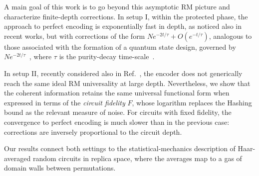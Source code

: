 \documentclass[aps,prl,twocolumn,superscriptaddress,numerical]{revtex4-2}
\begin{document}
A main goal of this work is to go beyond this asymptotic RM picture and characterize finite-depth corrections. In setup I, within the protected phase, the approach to perfect encoding is exponentially fast in depth, as noticed also in recent works, but with corrections of the form $N e^{-2t/\tau}+O(e^{-t/\tau})$, analogous to those associated with the formation of a quantum state design, governed by $N e^{-2t/\tau}$~\cite{lami2025anticoncentration,dowling2025freeindependenceunitarydesign,HarrowLow2009Designs,BrandaoHarrowHorodecki2016CMP,7rzk-2jyh}, where $\tau$ is the purity-decay time-scale~\cite{Nahum2017EntanglementGrowthPRX,Nahum2018OperatorSpreadingPRX}.

In setup II, recently considered also in Ref.~\cite{Nelson2025_ErrorCorrectionPhaseTransition_NoisyRandomCircuits}, the encoder does not generically reach the same ideal RM universality at large depth. Nevertheless, we show that the coherent information retains the same universal functional form when expressed in terms of the \emph{circuit fidelity} $F$, whose logarithm replaces the Hashing bound as the relevant measure of noise. For circuits with fixed fidelity, the convergence to perfect encoding is much slower than in the previous case: corrections are inversely proportional to the circuit depth.

Our results connect both settings to the statistical-mechanics description of Haar-averaged random circuits in replica space, where the averages map to a gas of domain walls between permutations.\\
\end{document}
